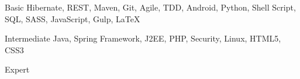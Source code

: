 

\begin{cvskills}

  \cvskill
    {Basic} %
    {Hibernate, REST, Maven, Git, Agile, TDD, Android, Python, Shell Script, SQL, SASS, JavaScript, Gulp, LaTeX} %

  \cvskill
    {Intermediate} %
    {Java, Spring Framework, J2EE, PHP, Security, Linux, HTML5, CSS3} %

  \cvskill
    {Expert} %
    {} %

\end{cvskills}
